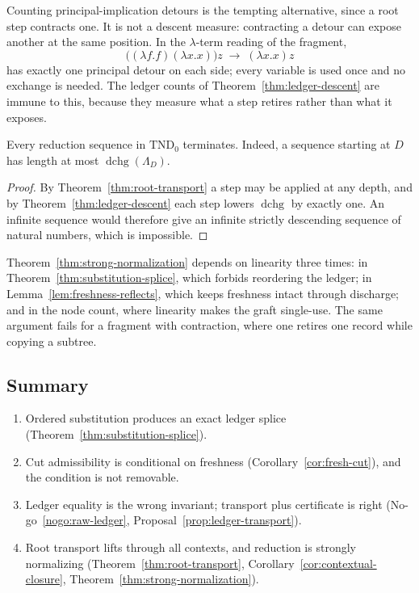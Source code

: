 \begin{remark}
Counting principal-implication detours is the tempting alternative, since a root step
contracts one.  It is not a descent measure: contracting a detour can expose another at the
same position.  In the $\lambda$-term reading of the fragment,
\[
  \bigl((\lambda f.f)(\lambda x.x)\bigr)z
  \;\longrightarrow\;
  (\lambda x.x)z
\]
has exactly one principal detour on each side; every variable is used once and no exchange
is needed.  The ledger counts of Theorem~\ref{thm:ledger-descent} are immune to this,
because they measure what a step retires rather than what it exposes.
\end{remark}

\begin{theorem}\label{thm:strong-normalization}
Every reduction sequence in $\mathrm{TND}_0$ terminates.  Indeed, a sequence starting at $D$
has length at most $\operatorname{dchg}(\Lambda_D)$.
\end{theorem}

\begin{proof}
By Theorem~\ref{thm:root-transport} a step may be applied at any depth, and by
Theorem~\ref{thm:ledger-descent} each step lowers $\operatorname{dchg}$ by exactly one.  An
infinite sequence would therefore give an infinite strictly descending sequence of natural
numbers, which is impossible.
\end{proof}

\begin{remark}
Theorem~\ref{thm:strong-normalization} depends on linearity three times: in
Theorem~\ref{thm:substitution-splice}, which forbids reordering the ledger; in
Lemma~\ref{lem:freshness-reflects}, which keeps freshness intact through discharge; and in
the node count, where linearity makes the graft single-use.  The same argument fails for a
fragment with contraction, where one retires one record while copying a subtree.
\end{remark}

\subsection{Summary}

\begin{enumerate}
\item Ordered substitution produces an exact ledger splice
  (Theorem~\ref{thm:substitution-splice}).
\item Cut admissibility is conditional on freshness
  (Corollary~\ref{cor:fresh-cut}), and the condition is not removable.
\item Ledger equality is the wrong invariant; transport plus certificate is right
  (No-go~\ref{nogo:raw-ledger}, Proposal~\ref{prop:ledger-transport}).
\item Root transport lifts through all contexts, and reduction is strongly normalizing
  (Theorem~\ref{thm:root-transport}, Corollary~\ref{cor:contextual-closure},
  Theorem~\ref{thm:strong-normalization}).
\end{enumerate}
